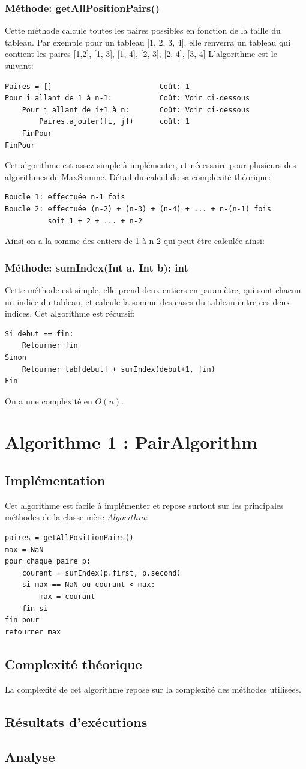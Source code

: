 \documentclass[a4paper, 12pt]{article}
\begin{document}
\subsubsection{Méthode: getAllPositionPairs()}
Cette méthode calcule toutes les paires possibles en fonction de la taille du tableau. Par exemple pour un tableau [1, 2, 3, 4], elle renverra un tableau qui contient les paires {[1,2], [1, 3], [1, 4], [2, 3], [2, 4], [3, 4]}
L'algorithme est le suivant:
\begin{verbatim}
Paires = []                         Coût: 1 
Pour i allant de 1 à n-1:           Coût: Voir ci-dessous
    Pour j allant de i+1 à n:       Coût: Voir ci-dessous
        Paires.ajouter([i, j])      coût: 1
    FinPour
FinPour
\end{verbatim}
Cet algorithme est assez simple à implémenter, et nécessaire pour plusieurs des algorithmes de MaxSomme. 
Détail du calcul de sa complexité théorique:
\begin{verbatim}
Boucle 1: effectuée n-1 fois
Boucle 2: effectuée (n-2) + (n-3) + (n-4) + ... + n-(n-1) fois
          soit 1 + 2 + ... + n-2
\end{verbatim}
Ainsi on a la somme des entiers de 1 à n-2 qui peut être calculée ainsi:

\subsubsection{Méthode: sumIndex(Int a, Int b): int}
Cette méthode est simple, elle prend deux entiers en paramètre, qui sont chacun un indice du tableau, et calcule la somme des cases du tableau entre ces deux indices. Cet algorithme est récursif:
\begin{verbatim}
Si debut == fin:
    Retourner fin
Sinon 
    Retourner tab[debut] + sumIndex(debut+1, fin)
Fin
\end{verbatim}
On a une complexité en $O(n)$.
\section{Algorithme 1 : PairAlgorithm}
\subsection{Implémentation}
Cet algorithme est facile à implémenter et repose surtout sur les principales méthodes de la classe mère $Algorithm$:
\begin{verbatim}
paires = getAllPositionPairs()
max = NaN
pour chaque paire p:
    courant = sumIndex(p.first, p.second)
    si max == NaN ou courant < max:
        max = courant
    fin si
fin pour
retourner max
\end{verbatim}

\subsection{Complexité théorique}
La complexité de cet algorithme repose sur la complexité des méthodes utilisées.

\subsection{Résultats d’exécutions}
\subsection{Analyse}
\end{document}
